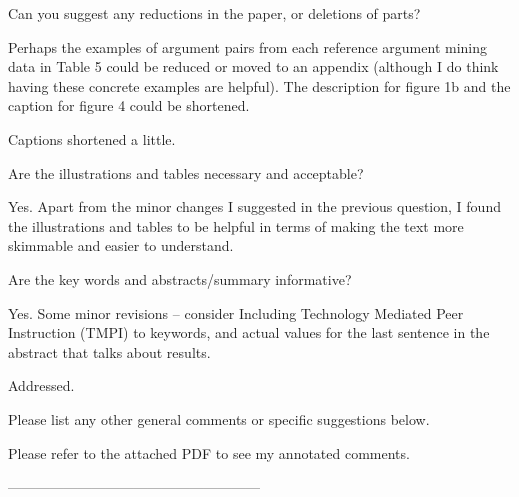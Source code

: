 \documentclass[notitlepage,12pt]{article}
\begin{document}
    \begin{revcomment}{Can you suggest any reductions in the paper, or deletions of parts?}

      Perhaps the examples of argument pairs from each reference argument mining data in Table 5 could be reduced or moved to an appendix (although I do think having these concrete examples are helpful). The description for figure 1b and the caption for figure 4 could be shortened.

      \begin{authors}
        Captions shortened a little.  
      \end{authors}

    \end{revcomment}

    \begin{revcomment}{Are the illustrations and tables necessary and acceptable?}


    Yes. Apart from the minor changes I suggested in the previous question, I found the illustrations and tables to be helpful in terms of making the text more skimmable and easier to understand.
    \end{revcomment}

    \begin{revcomment}{Are the key words and abstracts/summary informative?}


    Yes. Some minor revisions -- consider Including Technology Mediated Peer Instruction (TMPI) to keywords, and actual values for the last sentence in the abstract that talks about results.

    \begin{authors}
      Addressed.
    \end{authors}

    \end{revcomment}

    \begin{revcomment}{Please list any other general comments or specific suggestions below.}


    Please refer to the attached PDF to see my annotated comments.
    \end{revcomment}

------------------------------------------------------
\end{document}
